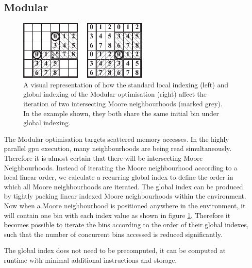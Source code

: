     

  \subsection{Modular}
\begin{figure}[!t]
\centering
\includegraphics[width=\linewidth]{../resources/modular/modular.pdf}
\caption{\label{fig:modular}A visual representation of how the standard local indexing (left) and global indexing of the Modular optimisation (right) affect the iteration of two intersecting Moore neighbourhoods (marked grey). In the example shown, they both share the same initial bin under global indexing.}
\end{figure}
    The Modular optimisation targets scattered memory accesses. In the highly parallel \gls{gpu} execution, many neighbourhoods are being read simultaneously. Therefore it is almost certain that there will be intersecting Moore Neighbourhoods. Instead of iterating the Moore neighbourhood according to a local linear order, we calculate a recurring global index to define the order in which all Moore neighbourhoods are iterated. The global index can be produced by tightly packing linear indexed Moore neighbourhoods within the environment. Now when a Moore neighbourhood is positioned anywhere in the environment, it will contain one bin with each index value as shown in figure \ref{fig:modular}. Therefore it becomes possible to iterate the bins according to the order of their global indexes, such that the number of concurrent bins accessed is reduced significantly.
    
    The global index does not need to be precomputed, it can be computed at runtime with minimal additional instructions and storage.
    
